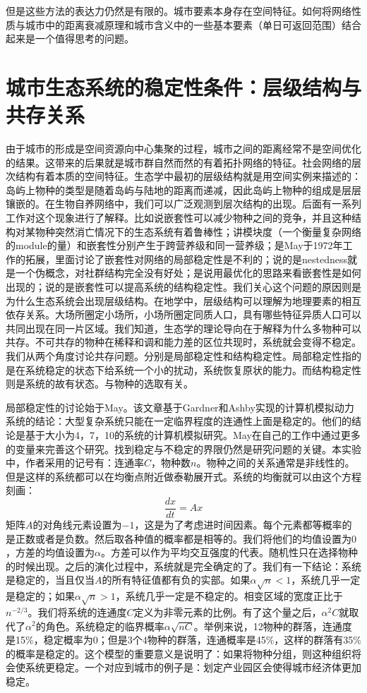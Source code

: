 但是这些方法的表达力仍然是有限的。城市要素本身存在空间特征。如何将网络性质与城市中的距离衰减原理和城市含义中的一些基本要素（单日可返回范围）结合起来是一个值得思考的问题。


\section{城市生态系统的稳定性条件：层级结构与共存关系}

由于城市的形成是空间资源向中心集聚的过程，城市之间的距离经常不是空间优化的结果。这带来的后果就是城市群自然而然的有着拓扑网络的特征。社会网络的层次结构有着本质的空间特征。生态学中最初的层级结构就是用空间实例来描述的：岛屿上物种的类型是随着岛屿与陆地的距离而递减，因此岛屿上物种的组成是层层镶嵌的。在生物自养网络\cite{Bascompte9383}中，我们可以广泛观测到层次结构的出现。后面有一系列工作对这个现象进行了解释。比如\cite{bastolla2009architecture}说嵌套性可以减少物种之间的竞争，并且这种结构对某物种突然消亡情况下的生态系统有着鲁棒性；\cite{thebault2010stability}讲模块度（一个衡量复杂网络的module的量）和嵌套性分别产生于跨营养级和同一营养级；\cite{Allesina2012}是May于1972年工作的拓展，里面讨论了嵌套性对网络的局部稳定性是不利的；\cite{james2012disentangling}说的是nestedness就是一个伪概念，对社群结构完全没有好处；\cite{suweis2013emergence}是说用最优化的思路来看嵌套性是如何出现的；\cite{rohr2014structural}说的是嵌套性可以提高系统的结构稳定性。我们关心这个问题的原因则是为什么生态系统会出现层级结构。在地学中，层级结构可以理解为地理要素的相互依存关系\cite{PhysRevE.83.036117}。大场所圈定小场所，小场所圈定同质人口，具有哪些特征异质人口可以共同出现在同一片区域。我们知道，生态学的理论导向在于解释为什么多物种可以共存。不可共存的物种在稀释和调和能力差的区位共现时，系统就会变得不稳定。我们从两个角度讨论共存问题。分别是局部稳定性和结构稳定性。局部稳定性指的是在系统稳定的状态下给系统一个小的扰动，系统恢复原状的能力。而结构稳定性则是系统的故有状态。与物种的选取有关。

局部稳定性的讨论始于May\cite{may1972will}。该文章基于Gardner和Ashby实现的计算机模拟动力系统的结论：大型复杂系统只能在一定临界程度的连通性上面是稳定的。他们的结论是基于大小为4，7，10的系统的计算机模拟研究。May在自己的工作中通过更多的变量来完善这个研究。找到稳定与不稳定的界限仍然是研究问题的关键。本实验中，作者采用的记号有：连通率\(C\)，物种数\(n\)。物种之间的关系通常是非线性的。但是这样的系统都可以在均衡点附近做泰勒展开式。系统的均衡就可以由这个方程刻画：\[\frac{dx}{dt} = Ax\]矩阵\(A\)的对角线元素设置为\(-1\)，这是为了考虑进时间因素。每个元素都等概率的是正数或者是负数。然后取各种值的概率都是相等的。我们将他们的均值设置为\(0\)，方差的均值设置为\(\alpha\)。方差可以作为平均交互强度的代表。随机性只在选择物种的时候出现。之后的演化过程中，系统就是完全确定的了。我们有一下结论：系统是稳定的，当且仅当\(A\)的所有特征值都有负的实部。如果\(\alpha\sqrt{n}<1\)，系统几乎一定是稳定的；如果\(\alpha\sqrt{n}>1\)，系统几乎一定是不稳定的。相变区域的宽度正比于\(n^{-2/3}\)。我们将系统的连通度\(C\)定义为非零元素的比例。有了这个量之后，\(\alpha^2C\)就取代了\(\alpha^2\)的角色。系统稳定的临界概率\(\alpha\sqrt{nC}\)。举例来说，12物种的群落，连通度是15\%，稳定概率为0；但是3个4物种的群落，连通概率是45\%，这样的群落有35\%的概率是稳定的。这个模型的重要意义是说明了：如果将物种分组，则这种组织将会使系统更稳定。一个对应到城市的例子是：划定产业园区会使得城市经济体更加稳定。


